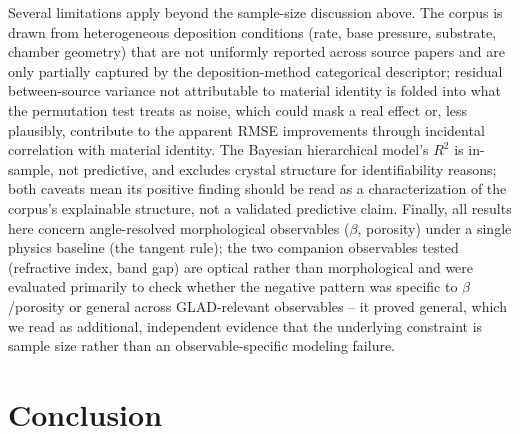 \documentclass[aip,amsmath,amssymb,reprint]{revtex4-1}
\begin{document}
Several limitations apply beyond the sample-size discussion above.
The corpus is drawn from heterogeneous deposition conditions (rate,
base pressure, substrate, chamber geometry) that are not uniformly
reported across source papers and are only partially captured by the
deposition-method categorical descriptor; residual between-source
variance not attributable to material identity is folded into what
the permutation test treats as noise, which could mask a real effect
or, less plausibly, contribute to the apparent RMSE improvements
through incidental correlation with material identity. The Bayesian
hierarchical model's $R^2$ is in-sample, not predictive, and excludes
crystal structure for identifiability reasons; both caveats mean its
positive finding should be read as a characterization of the corpus's
explainable structure, not a validated predictive claim. Finally, all
results here concern angle-resolved morphological observables
($\beta$, porosity) under a single physics baseline (the tangent
rule); the two companion observables tested (refractive index, band
gap) are optical rather than morphological and were evaluated
primarily to check whether the negative pattern was specific to
$\beta$/porosity or general across GLAD-relevant observables -- it
proved general, which we read as additional, independent evidence
that the underlying constraint is sample size rather than an
observable-specific modeling failure.

\section{Conclusion}
\label{sec:conclusion}
\end{document}
